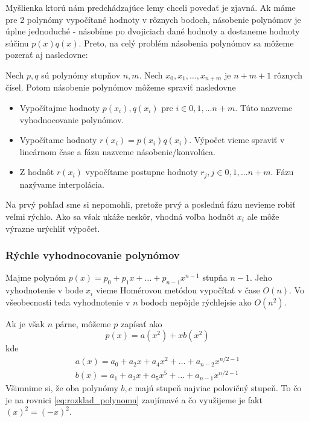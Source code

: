 Myšlienka ktorú nám predchádzajúce lemy chceli povedať je zjavná. Ak
máme pre 2 polynómy vypočítané hodnoty v rôznych bodoch, násobenie
polynómov je úplne jednoduché - násobíme po dvojiciach dané hodnoty a
dostaneme hodnoty súčinu $p(x)q(x)$. Preto, na celý problém násobenia
polynómov sa môžeme pozerať aj nasledovne:

Nech $p,q$ sú polynómy stupňov $n,m$. Nech $x_0,x_1,\dots, x_{n+m}$ je
$n+m+1$ rôznych čísel. Potom násobenie polynómov môžeme spraviť
nasledovne
\begin{itemize}
  \item Vypočítajme hodnoty $p(x_i), q(x_i)$ pre $i\in0,1,\dots n+m$.
  Túto nazveme vyhodnocovanie polynómov.
  \item Vypočítame hodnoty $r(x_i) = p(x_i) q(x_i)$. Výpočet vieme
  spraviť v lineárnom čase a fázu nazveme násobenie/konvolúca.
  \item Z hodnôt $r(x_i)$ vypočítame postupne hodnoty $r_j, j\in
  0,1,\dots n+m$. Fázu nazývame interpolácia.
\end{itemize}

Na prvý pohľad sme si nepomohli, pretože prvý a poslednú fázu nevieme
robiť veľmi rýchlo. Ako sa však ukáže neskôr, vhodná voľba hodnôt
$x_i$ ale môže výrazne urýchliť výpočet.

\subsubsection{Rýchle vyhodnocovanie polynómov}

Majme polynóm $p(x)=p_0 + p_1 x + \dots + p_{n-1} x^{n-1}$ stupňa $n-1$. Jeho vyhodnotenie v bode $x_i$ vieme
Homérovou metódou vypočítať v čase $O(n)$. Vo všeobecnosti teda
vyhodnotenie v $n$ bodoch nepôjde rýchlejsie ako $O(n^2)$.

Ak je však $n$ párne, môžeme $p$ zapísať ako
\begin{equation}
    p(x) = a(x^2) + x b(x^2)
    \label{eq:rozklad_polynomu}
\end{equation}
kde
\begin{eqnarray}
    a(x) = a_0 + a_2 x + a_4 x^2 + \dots + a_{n-2} x^{n/2-1} \\
    b(x) = a_1 + a_3 x + a_5 x^5 + \dots + a_{n-1} x^{n/2-1}
\end{eqnarray}
Všimnime si, že oba polynómy $b,c$ majú stupeň najviac polovičný
stupeň.
To čo je na rovnici \ref{eq:rozklad_polynomu} zaujímavé a čo využijeme
je fakt $(x)^2 = (-x)^2$.

